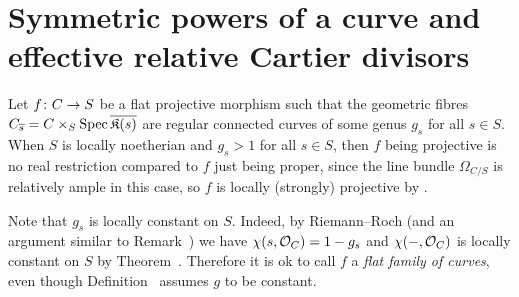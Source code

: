 \documentclass[a4paper,parskip=half,numbers=enddot, DIV=12]{scrreprt}
\begin{document}
\section{Symmetric powers of a curve and effective relative Cartier divisors}
Let $f\colon C\morphism S$ be a flat projective morphism such that the geometric fibres $C_{\overline{s}}=C\times_S\operatorname{Spec} \overline{\mathfrak{K}(s)}$ are regular connected curves of some genus $g_s$ for all $s\in S$. When $S$ is locally noetherian and $g_s>1$ for all $s\in S$, then $f$ being projective is no real restriction compared to  $f$ just being proper, since the line bundle $\Omega_{C/S}$ is relatively ample in this case, so $f$ is locally (strongly) projective by \cite[Theorem~6]{alggeo2}.
\begin{rem}
	Note that $g_s$ is locally constant on $S$. Indeed, by Riemann--Roch (and an argument similar to Remark~) we have $\chi(s,\mathcal{O}_C)=1-g_s$ and $\chi(-,\mathcal{O}_C)$ is locally constant on $S$ by Theorem~. Therefore it is ok to call $f$ a \emph{flat family of curves}, even though Definition~ assumes $g$ to be constant.
\end{rem}
\end{document}
